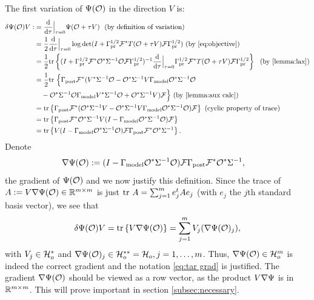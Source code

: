 \documentclass{amsart}
\numberwithin{equation}{section}
\begin{document}
The first variation of $\Psi (\mathcal{O})$ in the direction $V$ is:
\begin{align}\label{eq:tar var}
  \begin{split}
    \delta \Psi(\mathcal{O}) V 
    :&= \frac{\text{\textup{d}}}{\text{\textup{d}}\tau} \Big |_{\tau=0} \Psi(\mathcal{O} + \tau V)\  \text{ (by definition of variation)}\\
    &= \frac12 \frac{\text{\textup{d}}}{\text{\textup{d}} \tau} \Big |_{\tau=0} \log \det 
    (I + \Gamma_{\textup{pr}}^{1/2} \mathcal{F}^* T(\mathcal{O}+\tau V)\mathcal{F} \Gamma_{\textup{pr}}^{1/2} ) \text{ (by \eqref{eq:objective})}\\
    &= \frac12 \textup{tr}\left \{( I + \Gamma_{\textup{pr}}^{1/2} \mathcal{F}^* \mathcal{O}^* \Sigma^{-1}
    \mathcal{O}\mathcal{F} \Gamma_{\textup{pr}}^{1/2} )^{-1}
    \frac{\text{\textup{d}}}{\text{\textup{d}} \tau} \Big |_{\tau=0}
    \Gamma_{\textup{pr}}^{1/2} \mathcal{F}^* T(\mathcal{O}+\tau V) \mathcal{F} \Gamma_{\textup{pr}}^{1/2} \right \}\ \text{ (by \ref{lemma:lax})}\\
    &= \frac12 \textup{tr}\ \Big \{ \Gamma_{\textup{post}} \mathcal{F}^* (V^* \Sigma^{-1} \mathcal{O} 
    - \mathcal{O}^*\Sigma^{-1} V\Gamma_{\textup{model}} \mathcal{O}^* \Sigma^{-1}\mathcal{O} \\
    &\ \ \ - \mathcal{O}^* \Sigma^{-1} \mathcal{O} \Gamma_{\textup{model}} V^* \Sigma^{-1}\mathcal{O} 
    + \mathcal{O}^* \Sigma^{-1} V ) \mathcal{F} \Big \}  \text{ (by \ref{lemma:aux calc})}\\
    &= \textup{tr}\left \{\Gamma_{\textup{post}} \mathcal{F}^* ( \mathcal{O}^* \Sigma^{-1} V -
    \mathcal{O}^*\Sigma^{-1} V\Gamma_{\textup{model}} \mathcal{O}^* \Sigma^{-1}\mathcal{O} ) \mathcal{F} \right \} \text{
        (cyclic property of trace)} \\
    &= \textup{tr}\left \{\Gamma_{\textup{post}} \mathcal{F}^* \mathcal{O}^* \Sigma^{-1} V 
    ( I - \Gamma_{\textup{model}} \mathcal{O}^* \Sigma^{-1}\mathcal{O} ) \mathcal{F} \right \} \\
    &= \textup{tr}\left \{V ( I - \Gamma_{\textup{model}} \mathcal{O}^* \Sigma^{-1}\mathcal{O} )
    \mathcal{F} \Gamma_{\textup{post}} \mathcal{F}^* \mathcal{O}^* \Sigma^{-1} \right \}.
  \end{split}
\end{align} 
Denote
\begin{align}\label{eq:tar grad}
  \nabla \Psi(\mathcal{O}) &:= (I - \Gamma_{\textup{model}} \mathcal{O}^* \Sigma^{-1} \mathcal{O}) \mathcal{F}
  \Gamma_{\textup{post}} \mathcal{F}^* \mathcal{O}^*\Sigma^{-1},
\end{align}
the gradient of $\Psi (\mathcal{O} )$ and we now justify this definition.
Since the trace of $A := V \nabla \Psi(\mathcal{O}) \in \mathbb{R}^{m \times m}$ is
just $\textup{tr}\ A = \sum_{j=1}^m e_j^t A e_j$ (with $e_j$ the $j$th standard
basis vector), we see that
\begin{align*}
  \delta \Psi(\mathcal{O})V = \textup{tr}\left \{V \nabla \Psi(\mathcal{O}) \right \} = \sum_{j=1}^m
  V_j(\nabla \Psi(\mathcal{O})_j),
\end{align*}
with $V_j \in \mathcal{H}_o^*$ and $\nabla \Psi(\mathcal{O})_j \in \mathcal{H}_o^{**} =
\mathcal{H}_o, j=1,\dots,m$. Thus, $\nabla \Psi( \mathcal{O} ) \in \mathcal{H}_o^m$ is indeed
the correct gradient and the notation \eqref{eq:tar grad} is
justified. The gradient $\nabla \Psi(\mathcal{O})$ should be viewed as a row
vector, as the product $V \nabla \Psi$ is in $\mathbb{R}^{m \times m}$. This
will prove important in section \ref{subsec:necessary}.
\end{document}
